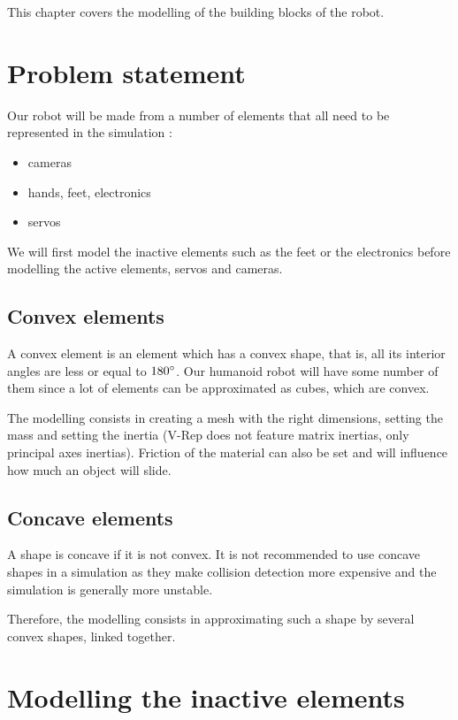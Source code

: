 This chapter covers the modelling of the building blocks of the robot.

\section{Problem statement}
Our robot will be made from a number of elements that all need to be represented in the simulation :\begin{itemize}
\item cameras
\item hands, feet, electronics
\item servos
\end{itemize}
We will first model the inactive elements such as the feet or the electronics before modelling the active elements, servos and cameras.

\subsection{Convex elements}
A convex element is an element which has a convex shape, that is, all its interior angles are less or equal to $180\degree$. Our humanoid robot will have some number of them since a lot of elements can be approximated as cubes, which are convex.

The modelling consists in creating a mesh with the right dimensions, setting the mass and setting the inertia (V-Rep does not feature matrix inertias, only principal axes inertias). Friction of the material can also be set and will influence how much an object will slide.

\subsection{Concave elements}
A shape is concave if it is not convex. It is not recommended to use concave shapes in a simulation as they make collision detection more expensive and the simulation is generally more unstable. 

Therefore, the modelling consists in approximating such a shape by several convex shapes, linked together.

\section{Modelling the inactive elements}


